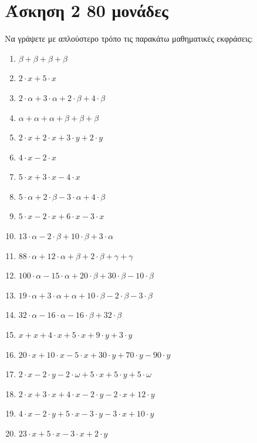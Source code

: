 \documentclass[a4paper,10pt]{report}
\begin{document}
\section*{Άσκηση 2  \hfill \small{80 μονάδες}}
Να γράψετε με απλούστερο τρόπο τις παρακάτω μαθηματικές εκφράσεις:
\begin{enumerate}[1)]
 \item $β+β+β+β$
 \item $2\cdot x+5\cdot x$
 \item $2\cdot α+ 3\cdot α+2\cdot β+4\cdot β$
 \item $α+α+α+β+β+β$
 \item $2\cdot x+2\cdot x+3\cdot y +2\cdot y$
 \item $4\cdot x -2\cdot x  $
 \item $5\cdot x+3\cdot x -4\cdot x$
 \item $5\cdot α+2\cdot β-3\cdot α+4\cdot β$
 \item $5\cdot x-2\cdot x+6\cdot x -3\cdot x$
 \item $13\cdot α-2\cdot β+10\cdot β+3\cdot α$
 \item $88\cdot α + 12\cdot α+β+2\cdot β+γ+γ$
 \item $100\cdot α-15\cdot α+20\cdot β +30\cdot β -10\cdot β$
 \item $19\cdot α+3\cdot α+α+10\cdot β-2\cdot β -3\cdot β$
 \item $32\cdot α-16\cdot α-16\cdot β +32\cdot β$
 \item $x+x+4\cdot x+5\cdot x+9\cdot y+3\cdot y$
 \item $20\cdot x+10\cdot x-5\cdot x+30\cdot y+70\cdot y-90\cdot y$
 \item $2\cdot x-2\cdot y-2\cdot ω+5\cdot x+5\cdot y+5\cdot ω$
 \item $2\cdot x+3\cdot x+4\cdot x-2\cdot y-2\cdot x+12\cdot y$
 \item $4\cdot x-2\cdot y+5\cdot x-3\cdot y-3\cdot x+10\cdot y$
 \item $23\cdot x+5\cdot x-3\cdot x+2\cdot y$
\end{enumerate}
\end{document}
